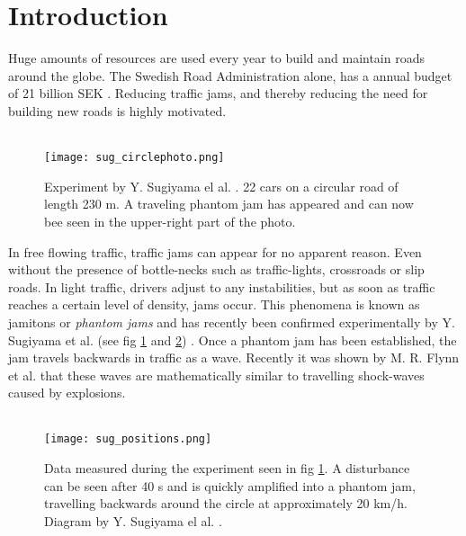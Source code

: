 \section{Introduction}

Huge amounts of resources are used every year to build and maintain roads
around the globe. The Swedish Road Administration alone, has a annual budget
of 21 billion SEK \cite{vagverket}. Reducing traffic jams, and thereby
reducing the need for building new roads is highly motivated.\\\\

\begin{figure}[H]
    \begin{center}
    \texttt{[image: sug\_circlephoto.png]}
    \caption{\label{sug_photo}
Experiment by Y. Sugiyama el al. \cite{sugiyama}. 22 cars on a circular road
of length 230 m. A traveling phantom jam has appeared and can now bee seen in
the upper-right part of the photo.
} \end{center} \end{figure}

In free flowing traffic, traffic jams can appear for no apparent reason. Even
without the presence of bottle-necks such as traffic-lights, crossroads or
slip roads. In light traffic, drivers adjust to any
instabilities, but as soon as traffic reaches a certain level of density, jams
occur. This phenomena is known as jamitons or \emph{phantom jams} and has
recently been confirmed experimentally by Y. Sugiyama et al. (see fig
\ref{sug_photo} and \ref{sug_positions}) \cite{sugiyama}. Once a phantom jam has been
established, the jam travels backwards in traffic as a wave. Recently it was
shown by M. R. Flynn et al. \cite{mit} that these waves are mathematically
similar to travelling shock-waves caused by explosions.\\\\

\begin{figure}[H]
    \begin{center}
    \texttt{[image: sug\_positions.png]}
    \caption{\label{sug_positions}
Data measured during the experiment seen in fig \ref{sug_photo}. A disturbance
can be seen after 40 s and is quickly amplified into a phantom jam, travelling
backwards around the circle at approximately 20 km/h.
Diagram by Y. Sugiyama el al. \cite{sugiyama}.}
\end{center} \end{figure}


